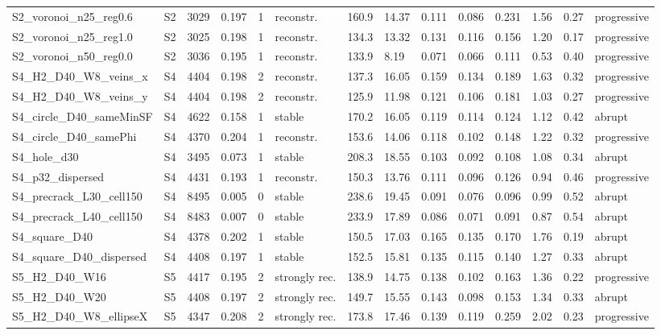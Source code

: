 \begin{landscape}
\begin{longtable}{llllllllllllll}
S2\_voronoi\_n25\_reg0.6 & S2 & 3029 & 0.197 & 1 & reconstr. & 160.9 & 14.37 & 0.111 & 0.086 & 0.231 & 1.56 & 0.27 & progressive\\
S2\_voronoi\_n25\_reg1.0 & S2 & 3025 & 0.198 & 1 & reconstr. & 134.3 & 13.32 & 0.131 & 0.116 & 0.156 & 1.20 & 0.17 & progressive\\
S2\_voronoi\_n50\_reg0.0 & S2 & 3036 & 0.195 & 1 & reconstr. & 133.9 & 8.19 & 0.071 & 0.066 & 0.111 & 0.53 & 0.40 & progressive\\
S4\_H2\_D40\_W8\_veins\_x & S4 & 4404 & 0.198 & 2 & reconstr. & 137.3 & 16.05 & 0.159 & 0.134 & 0.189 & 1.63 & 0.32 & progressive\\
S4\_H2\_D40\_W8\_veins\_y & S4 & 4404 & 0.198 & 2 & reconstr. & 125.9 & 11.98 & 0.121 & 0.106 & 0.181 & 1.03 & 0.27 & progressive\\
S4\_circle\_D40\_sameMinSF & S4 & 4622 & 0.158 & 1 & stable & 170.2 & 16.05 & 0.119 & 0.114 & 0.124 & 1.12 & 0.42 & abrupt\\
S4\_circle\_D40\_samePhi & S4 & 4370 & 0.204 & 1 & reconstr. & 153.6 & 14.06 & 0.118 & 0.102 & 0.148 & 1.22 & 0.32 & progressive\\
S4\_hole\_d30 & S4 & 3495 & 0.073 & 1 & stable & 208.3 & 18.55 & 0.103 & 0.092 & 0.108 & 1.08 & 0.34 & abrupt\\
S4\_p32\_dispersed & S4 & 4431 & 0.193 & 1 & reconstr. & 150.3 & 13.76 & 0.111 & 0.096 & 0.126 & 0.94 & 0.46 & progressive\\
S4\_precrack\_L30\_cell150 & S4 & 8495 & 0.005 & 0 & stable & 238.6 & 19.45 & 0.091 & 0.076 & 0.096 & 0.99 & 0.52 & abrupt\\
S4\_precrack\_L40\_cell150 & S4 & 8483 & 0.007 & 0 & stable & 233.9 & 17.89 & 0.086 & 0.071 & 0.091 & 0.87 & 0.54 & abrupt\\
S4\_square\_D40 & S4 & 4378 & 0.202 & 1 & stable & 150.5 & 17.03 & 0.165 & 0.135 & 0.170 & 1.76 & 0.19 & abrupt\\
S4\_square\_D40\_dispersed & S4 & 4408 & 0.197 & 1 & stable & 152.5 & 15.81 & 0.135 & 0.115 & 0.140 & 1.27 & 0.33 & abrupt\\
S5\_H2\_D40\_W16 & S5 & 4417 & 0.195 & 2 & strongly rec. & 138.9 & 14.75 & 0.138 & 0.102 & 0.163 & 1.36 & 0.22 & progressive\\
S5\_H2\_D40\_W20 & S5 & 4408 & 0.197 & 2 & strongly rec. & 149.7 & 15.55 & 0.143 & 0.098 & 0.153 & 1.34 & 0.33 & abrupt\\
S5\_H2\_D40\_W8\_ellipseX & S5 & 4347 & 0.208 & 2 & strongly rec. & 173.8 & 17.46 & 0.139 & 0.119 & 0.259 & 2.02 & 0.23 & progressive\\

\end{longtable}
\end{landscape}
